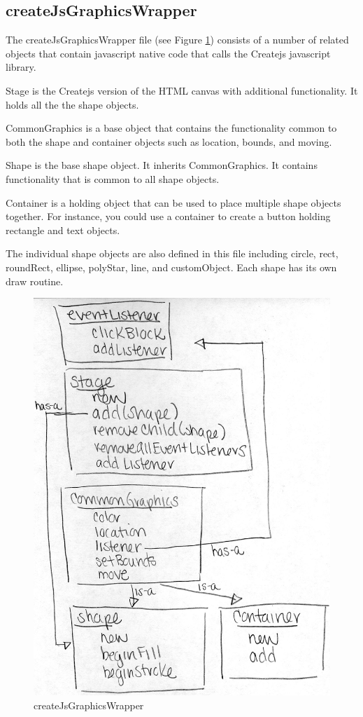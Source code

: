 \documentclass{article}
\begin{document}
\subsection{createJsGraphicsWrapper}
The createJsGraphicsWrapper file (see Figure \ref{fig:createjsGraphicsWrapper}) consists of a number of related objects that contain
javascript native code that calls the Createjs javascript library.

Stage is the Createjs version of the HTML canvas with additional functionality. It holds
all the the shape objects.

CommonGraphics is a base object that contains the functionality common to both the
shape and container objects such as location, bounds, and moving.

Shape is the base shape object. It inherits CommonGraphics. It contains functionality
that is common to all shape objects.

Container is a holding object that can be used to place multiple shape objects together.
For instance, you could use a container to create a button holding rectangle and text
objects.

The individual shape objects are also defined in this file including circle, rect, roundRect,
ellipse, polyStar, line, and customObject. Each shape has its own draw routine.

\begin{figure}
\includegraphics[scale=0.5]{createJsGraphicsWrapper}
\centering
\caption{createJsGraphicsWrapper}
\label{fig:createjsGraphicsWrapper}
\end{figure}
\end{document}
